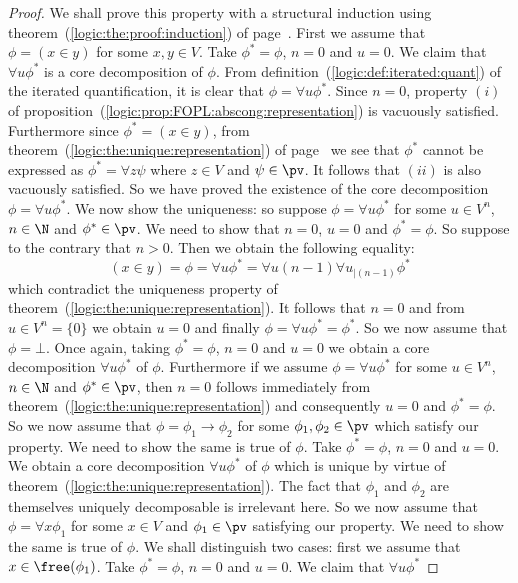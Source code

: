 \begin{proof}
We shall prove this property with a structural induction using
theorem~(\ref{logic:the:proof:induction}) of
page~\pageref{logic:the:proof:induction}. First we assume that
$\phi=(x\in y)$ for some $x,y\in V$. Take $\phi^{*}=\phi$, $n=0$ and
$u=0$. We claim that $\forall u\phi^{*}$ is a core decomposition of
$\phi$. From definition~(\ref{logic:def:iterated:quant}) of the
iterated quantification, it is clear that $\phi=\forall u\phi^{*}$.
Since $n=0$, property $(i)$ of
proposition~(\ref{logic:prop:FOPL:abscong:representation}) is
vacuously satisfied. Furthermore since $\phi^{*}=(x\in y)$, from
theorem~(\ref{logic:the:unique:representation}) of
page~\pageref{logic:the:unique:representation} we see that
$\phi^{*}$ cannot be expressed as $\phi^{*}=\forall z\psi$ where
$z\in V$ and $\psi\in\pv$. It follows that $(ii)$ is also vacuously
satisfied. So we have proved the existence of the core decomposition
$\phi=\forall u\phi^{*}$. We now show the uniqueness: so suppose
$\phi=\forall u\phi^{*}$ for some $u\in V^{n}$, $n\in\N$ and
$\phi^{*}\in\pv$. We need to show that $n=0$, $u=0$ and
$\phi^{*}=\phi$. So suppose to the contrary that $n>0$. Then we
obtain the following equality:
    \[
    (x \in y)=\phi=\forall u\phi^{*}=\forall u(n-1)\forall
    u_{|(n-1)}\phi^{*}
    \]
which contradict the uniqueness property of
theorem~(\ref{logic:the:unique:representation}). It follows that
$n=0$ and from $u\in V^{n}=\{0\}$ we obtain $u=0$ and finally
$\phi=\forall u\phi^{*}=\phi^{*}$. So we now assume that
$\phi=\bot$. Once again, taking $\phi^{*}=\phi$, $n=0$ and $u=0$ we
obtain a core decomposition $\forall u\phi^{*}$ of $\phi$.
Furthermore if we assume $\phi=\forall u\phi^{*}$ for some $u\in
V^{n}$, $n\in\N$ and $\phi^{*}\in\pv$, then $n=0$ follows
immediately from theorem~(\ref{logic:the:unique:representation}) and
consequently $u=0$ and $\phi^{*}=\phi$. So we now assume that
$\phi=\phi_{1}\to\phi_{2}$ for some $\phi_{1},\phi_{2}\in\pv$ which
satisfy our property. We need to show the same is true of $\phi$.
Take $\phi^{*}=\phi$, $n=0$ and $u=0$. We obtain a core
decomposition $\forall u\phi^{*}$ of $\phi$ which is unique by
virtue of theorem~(\ref{logic:the:unique:representation}). The fact
that $\phi_{1}$ and $\phi_{2}$ are themselves uniquely decomposable
is irrelevant here. So we now assume that $\phi=\forall x\phi_{1}$
for some $x\in V$ and $\phi_{1}\in\pv$ satisfying our property. We
need to show the same is true of $\phi$. We shall distinguish two
cases: first we assume that $x\in\free(\phi_{1})$. Take
$\phi^{*}=\phi$, $n=0$ and $u=0$. We claim that $\forall u\phi^{*}$

\end{proof}
